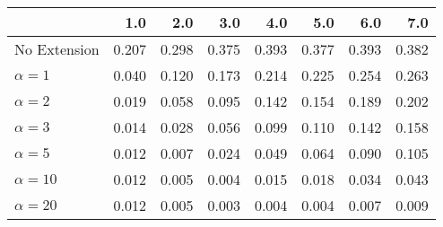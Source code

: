 \begin{tabular}{lrrrrrrr}
\toprule
{} &   1.0 &   2.0 &   3.0 &   4.0 &   5.0 &   6.0 &   7.0 \\
\midrule
No Extension  & 0.207 & 0.298 & 0.375 & 0.393 & 0.377 & 0.393 & 0.382 \\
$\alpha = 1$  & 0.040 & 0.120 & 0.173 & 0.214 & 0.225 & 0.254 & 0.263 \\
$\alpha = 2$  & 0.019 & 0.058 & 0.095 & 0.142 & 0.154 & 0.189 & 0.202 \\
$\alpha = 3$  & 0.014 & 0.028 & 0.056 & 0.099 & 0.110 & 0.142 & 0.158 \\
$\alpha = 5$  & 0.012 & 0.007 & 0.024 & 0.049 & 0.064 & 0.090 & 0.105 \\
$\alpha = 10$ & 0.012 & 0.005 & 0.004 & 0.015 & 0.018 & 0.034 & 0.043 \\
$\alpha = 20$ & 0.012 & 0.005 & 0.003 & 0.004 & 0.004 & 0.007 & 0.009 \\
\bottomrule
\end{tabular}
